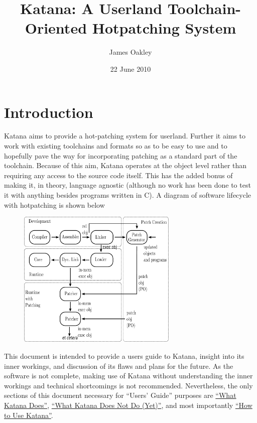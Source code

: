 \documentclass[11pt]{article}
\title{Katana: A Userland Toolchain-Oriented Hotpatching System}
\author{James Oakley}
\date{22 June 2010}
\begin{document}
\maketitle

\setcounter{tocdepth}{3}
\tableofcontents
\vspace*{1cm}


\section{Introduction}
\label{sec-1}

  Katana aims to provide a hot-patching system for userland. Further
  it aims to work with existing toolchains and formats so as to be
  easy to use and to hopefully pave the way for incorporating patching
  as a standard part of the toolchain. Because of this aim, Katana
  operates at the object level rather than requiring any access to the
  source code itself. This has the added bonus of making it, in
  theory, language agnostic (although no work has been done to test it
  with anything besides programs written in C). A diagram of software
  lifecycle with hotpatching is shown below


\begin{figure}[h!]
\includegraphics[width=3in]{./softwarelifecycle.pdf}
\end{figure}


  This document is intended to provide a users guide to Katana,
  insight into its inner workings, and discussion of its flaws and
  plans for the future. As the software is not complete, making use of
  Katana without understanding the inner workings and technical
  shortcomings is not recommended. Nevertheless, the only sections of
  this document necessary for ``Users' Guide'' purposes are 
  \hyperref[sec-3]{``What Katana Does''}, \hyperref[sec-4]{``What Katana Does Not Do (Yet)''}, and most importantly 
  \hyperref[sec-6]{``How to Use Katana''}.
 
\end{document}
